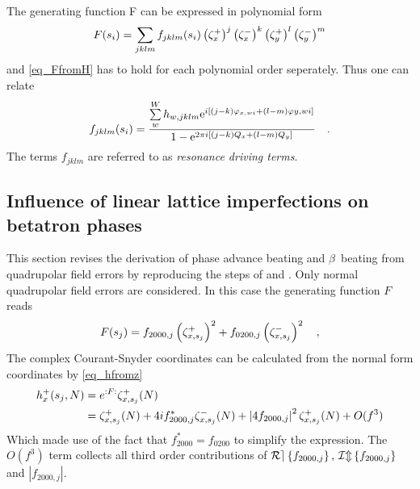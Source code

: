 %
The generating function F can be expressed in polynomial form
%
\begin{equation}
    F(s_i) = \sum\limits_{jklm} f_{jklm}(s_i) \left(\zeta_x^+\right)^{j} \left(\zeta_x^-\right)^{k} \left(\zeta_y^+\right)^{l} \left(\zeta_y^-\right)^{m}
\end{equation}
%
and \eqref{eq_FfromH} has to hold for each polynomial order seperately. Thus one can relate 
%
\begin{equation}
    f_{jklm}(s_i)=\frac{
        \sum\limits_w^W h_{w,jklm} \text{e}^{i \left[ (j-k) \varphi_{x,wi} + (l-m)\varphi{y,wi} \right]}
    }{
        1-\text{e}^{2\pi i [(j-k)Q_x+(l-m)Q_y]}
    }
    \quad .
\end{equation}
%
The terms $f_{jklm}$ are referred to as \emph{resonance driving terms}.

\subsection{Influence of linear lattice imperfections on betatron phases}
\label{sec:deriv}
\label{sec_phase_beating}

This section revises the derivation of phase advance beating and $\beta$~beating from quadrupolar field errors
by reproducing the steps of \cite{Franchi2014} and \cite{Franchi2016}. 
Only normal quadrupolar field errors are considered.
In this case the generating function $F$ reads
%
\begin{equation}
  F(s_j) = f_{2000,j} \left( \zeta_{x,s_j}^+ \right) ^2 + f_{0200,j} \left( \zeta_{x,s_j}^- \right)^2 \notag
  \quad ,
  \label{eq_F_quad}
\end{equation}
%
The complex Courant-Snyder coordinates can be calculated from the normal form coordinates by
\eqref{eq_hfromz}
%
\begin{align}
  h_x^+(s_j, N) &= e^{:F:}\zeta_{x,s_j}^+(N) \notag \\
  &= \zeta_{x,s_j}^+(N) + 4if_{2000,j}^* \zeta_{x,s_j}^-(N) 
  + \left| 4 f_{2000,j} \right|^2 \zeta_{x, s_j}^+(N) +
  O(f^3)
  \label{eq_h_2ndorder}
\end{align}
%
Which made use of the fact that $f_{2000}^* = f_{0200}$ to simplify the expression.
The $O(f^3) $ term collects all third order contributions of $\mathcal{Re} \left\{ f_{2000,j} \right\},\,\mathcal{Im} \left\{ f_{2000,j} \right\}$ and 
$\left| f_{2000,j}\right|$.


